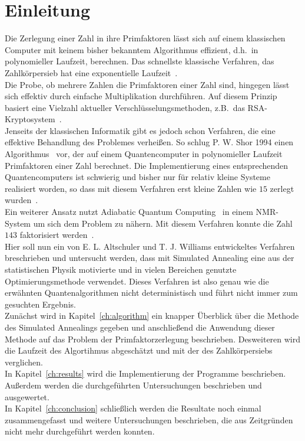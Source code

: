 \chapter{Einleitung}
Die Zerlegung einer Zahl in ihre Primfaktoren lässt sich auf einem klassischen Computer mit keinem bisher bekanntem Algorithmus effizient, d.h.\ in polynomieller Laufzeit, berechnen. Das schnellste klassische Verfahren, das Zahlkörpersieb hat eine exponentielle Laufzeit~\parencite{pomerance}.\\
Die Probe, ob mehrere Zahlen die Primfaktoren einer Zahl sind, hingegen lässt sich effektiv durch einfache Multiplikation durchführen. Auf diesem Prinzip basiert eine Vielzahl aktueller Verschlüsselungsmethoden, z.B.\ das RSA-Kryptosystem~\parencite{rsa}. \\
Jenseits der klassischen Informatik gibt es jedoch schon Verfahren, die eine effektive Behandlung des Problemes verheißen. So schlug P. W. Shor 1994 einen Algorithmus~\parencite{shor} vor, der auf einem Quantencomputer in polynomieller Laufzeit Primfaktoren einer Zahl berechnet. Die Implementierung eines entsprechenden Quantencomputers ist schwierig und bisher nur für relativ kleine Systeme realisiert worden, so dass mit diesem Verfahren erst kleine Zahlen wie $15$ zerlegt wurden~\parencite{vandersypen}.\\
Ein weiterer Ansatz nutzt Adiabatic Quantum Computing~\parencite{suter} in einem NMR-System um sich dem Problem zu nähern. Mit diesem Verfahren konnte die Zahl $143$ faktorisiert werden~\parencite{xu}. \\
Hier soll nun ein von E. L. Altschuler und T. J. Williams entwickeltes Verfahren~\parencite{altschuler} breschrieben und untersucht werden, dass mit Simulated Annealing eine aus der statistischen Physik motivierte und in vielen Bereichen genutzte Optimierungsmethode verwendet. Dieses Verfahren ist also genau wie die erwähnten Quantenalgorithmen nicht deterministisch und führt nicht immer zum gesuchten Ergebnis.\\
Zunächst wird in Kapitel~\ref{ch:algorithm} ein knapper Überblick über die Methode des Simulated Annealings gegeben und anschließend die Anwendung dieser Methode auf das Problem der Primfaktorzerlegung beschrieben. Desweiteren wird die Laufzeit des Algortihmus abgeschätzt und mit der des Zahlkörpersiebs verglichen.\\
In Kapitel~\ref{ch:results} wird die Implementierung der Programme beschrieben. Außerdem werden die durchgeführten Untersuchungen beschrieben und ausgewertet.\\
In Kapitel~\ref{ch:conclusion} schließlich werden die Resultate noch einmal zusammengefasst und weitere Untersuchungen beschrieben, die aus Zeitgründen nicht mehr durchgeführt werden konnten.
